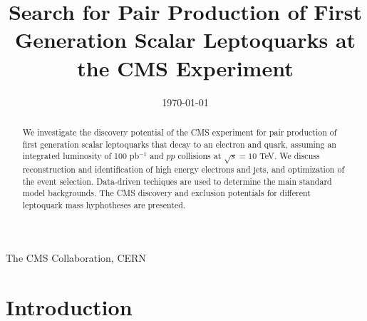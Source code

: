 \documentclass{cmspaper}
\begin{document}
\begin{linenumbers}

\begin{titlepage}



\date{\today}

\title{Search for Pair Production of First Generation Scalar Leptoquarks at the CMS Experiment}


  \begin{Authlist}
    The CMS Collaboration, CERN
  \end{Authlist}


  \begin{abstract}
    We investigate the discovery potential of the CMS experiment
for pair production of first generation scalar leptoquarks that 
    decay to an electron and quark, assuming 
an integrated luminosity of 100 pb$^{-1}$ and $pp$ collisions 
    at $\sqrt{s}=10$ TeV.
    We discuss 
   reconstruction and identification of high energy electrons and jets, 
    and optimization of the event selection.
    Data-driven techiques are used to determine 
the main standard model backgrounds. 
The CMS discovery and exclusion potentials for different leptoquark 
mass hyphotheses are presented.

  \end{abstract} 

\end{titlepage}

\setcounter{page}{2}%

\section{Introduction}
 

\end{linenumbers}
\end{document}
